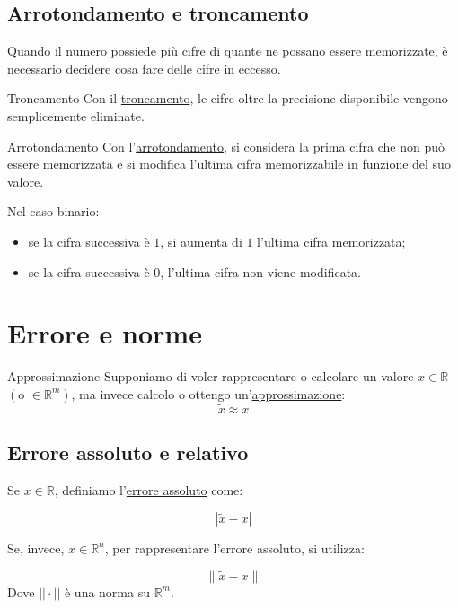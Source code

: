\documentclass{article}
\begin{document}
\subsection{Arrotondamento e troncamento}

Quando il numero possiede più cifre di quante ne possano essere memorizzate, è necessario decidere cosa fare delle cifre in eccesso.

\begin{defi}{Troncamento}{}
    Con il \underline{troncamento}, le cifre oltre la precisione disponibile vengono semplicemente eliminate.
\end{defi}

\begin{defi}{Arrotondamento}{}
    Con l'\underline{arrotondamento}, si considera la prima cifra che non può essere memorizzata e si modifica l'ultima cifra memorizzabile in funzione del suo valore.

    Nel caso binario:
    \begin{itemize}
        \item se la cifra successiva è $1$, si aumenta di $1$ l'ultima cifra memorizzata;
        \item se la cifra successiva è $0$, l'ultima cifra non viene modificata.
    \end{itemize}
\end{defi}
\newpage
\section{Errore e norme}

\begin{defi}{Approssimazione}{}
    Supponiamo di voler rappresentare o calcolare un valore $x\in\mathbb{R}$ $\left(\text{o }\in\mathbb{R}^m\right)$,
    ma invece calcolo o ottengo un'\underline{approssimazione}: $$\widetilde{x}\approx x$$
\end{defi}

\subsection{Errore assoluto e relativo}

Se $x\in\mathbb{R}$, definiamo l'\underline{errore assoluto} come:

$$
    \boxed{
        |\widetilde{x}-x|
    }
$$

Se, invece, $x\in\mathbb{R}^n$, per rappresentare l'errore assoluto, si utilizza:

$$
    \boxed{
        \|\widetilde{x}-x\|
    }
$$
Dove $||\cdot||$ è una norma su $\mathbb R^m$.
\end{document}
